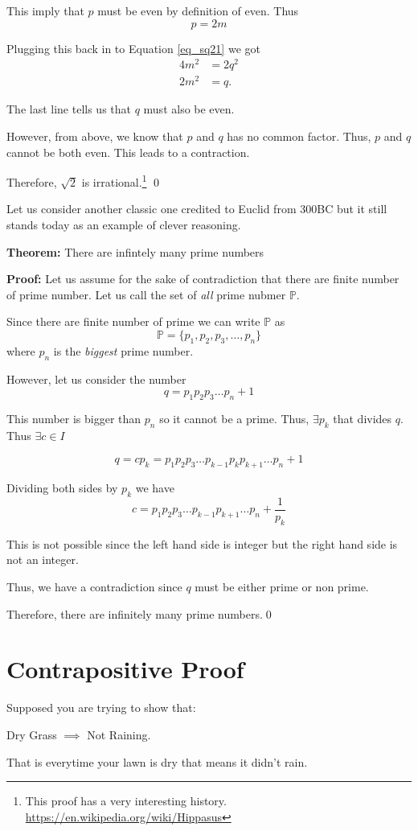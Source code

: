 \documentclass[a4paper, 12pt]{article}
\newcommand{\theorem}{\noindent\textbf{Theorem:} }
\renewcommand{\proof}{\noindent\textbf{Proof:} }
\newcommand{\qedd}{\qed\newline}
\theoremstyle{examplestyle}
\begin{document}
\begin{multicols}{2}
This imply that $p$ must be even by definition of even. Thus
\[
	p = 2m
\]

Plugging this back in to Equation \ref{eq_sq21} we got
\begin{align*}
	4m^2 &= 2 q^2\\
	2m^2 &= q.
\end{align*}

The last line tells us that $q$ must also be even.

However, from above, we know that $p$ and $q$ has no common factor. Thus, $p$ and $q$ cannot be both even. This leads to a contraction.

Therefore, $\sqrt{2}$ is irrational.\footnote{This proof has a very interesting history. \url{https://en.wikipedia.org/wiki/Hippasus}}
\qedd

Let us consider another classic one credited to Euclid from 300BC but it still stands today as an example of clever reasoning.

\noindent\theorem There are infintely many prime numbers

\noindent\proof Let us assume for the sake of contradiction that there are finite number of prime number. Let us call the set of \emph{all} prime nubmer $\mathbb{P}$.

Since there are finite number of prime we can write $\mathbb{P}$ as
\[
	\mathbb{P} = \{p_1, p_2, p_3, \ldots, p_n\}
\]
where $p_n$ is the \emph{biggest} prime number.

However, let us consider the number
\[
	q = p_1p_2p_3\ldots p_n + 1 
\]

This number is bigger than $p_n$ so it cannot be a prime. Thus, $\exists p_k$ that divides $q$. Thus $\exists c \in I$

\[
q = cp_k = p_1p_2p_3\ldots p_{k-1} p_k p_{k+1} \ldots p_n + 1 
\]

Dividing both sides by $p_k$ we have
\[
c = p_1p_2p_3\ldots p_{k-1} p_{k+1} \ldots p_n + \frac{1}{p_k}
\]

This is not possible since the left hand side is integer but the right hand side is not an integer.

Thus, we have a contradiction since $q$ must be either prime or non prime.

Therefore, there are infinitely many prime numbers.\qedd

\section*{Contrapositive Proof}
Supposed you are trying to show that:
\begin{center}
	Dry Grass $\implies$ Not Raining.
\end{center}
That is everytime your lawn is dry that means it didn't rain.


\end{multicols}
\end{document}
